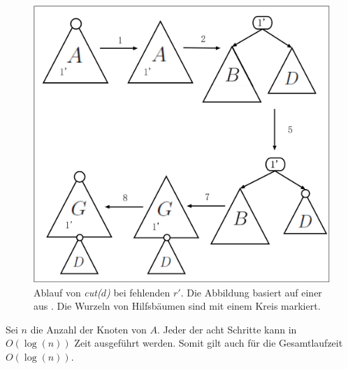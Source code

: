 \documentclass[a4paper,12pt]{article}
\begin{document}
\begin{figure}[H]
	\centering
	\includegraphics[width=1\textwidth]{Medien/Tango/cut2}
	\caption{Ablauf von \textit{cut($d$)} bei fehlenden $r'$. Die Abbildung basiert auf einer aus \cite{demainDinamicOpti}. Die Wurzeln von Hilfsbäumen sind mit einem Kreis markiert. }
	\label{fig:cut2}
\end{figure}
\noindent Sei $n$ die Anzahl der Knoten von $A$. Jeder der acht Schritte kann in $O\left(\log \left(n\right)\right)$ Zeit ausgeführt werden. Somit gilt auch für die Gesamtlaufzeit $O\left(\log \left(n\right)\right)$.
\end{document}
